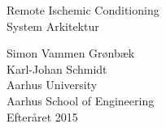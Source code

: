\thispagestyle{empty} %


\colorbox{usDef}{
	\parbox[t]{1.0\linewidth}{
		\centering \fontsize{30pt}{50pt}\selectfont %
		\vspace*{0.7cm} %
		
		\hfill Remote Ischemic Conditioning\\
		\hfill System Arkitektur \\
		
		\vspace*{0.7cm} %
	}
}

\vfill %


{\centering \large 
	\hfill Simon Vammen Grønbæk \\
	\hfill Karl-Johan Schmidt\\
	\hfill Aarhus University \\
	\hfill Aarhus School of Engineering\\
	\hfill Efteråret 2015 \\
}

\clearpage %